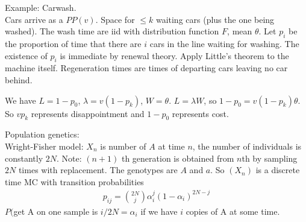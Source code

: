 \documentclass[a4paper]{article}
\begin{document}
Example: Carwash.\\
Cars arrive as a $PP(v)$. Space for $\leq k$ waiting cars (plus the one being washed). The wash time are iid with distribution function $F$, mean $\theta$. Let $p_i$ be the proportion of time that there are $i$ cars in the line waiting for washing. The existence of $p_i$ is immediate by renewal theory. Apply Little's theorem to the machine itself. Regeneration times are times of departing cars leaving no car behind.

We have $L=1-p_0$, $\lambda = v(1-p_k)$, $W = \theta$. $L=\lambda W$, so $1-p_0 = v(1-p_k)\theta$. So $vp_k$ represents disappointment and $1-p_0$ represents cost.

Population genetics:\\
Wright-Fisher model: $X_n$ is number of $A$ at time $n$, the number of individuals is constantly $2N$. Note: $(n+1)$ th generation is obtained from $n$th by sampling $2N$ times with replacement. The genotypes are $A$ and $a$. So $(X_n)$ is a discrete time MC with transition probabilities 
\begin{equation*}
\begin{aligned}
p_{ij} = {2N \choose j} \alpha_i^j (1-\alpha_i)^{2N-j}
\end{aligned}
\end{equation*}
$P($get A on one sample is $i/2N = \alpha_i$ if we have $i$ copies of A at some time.

\end{document}
